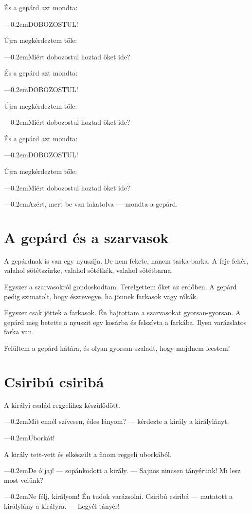 \documentclass[12pt]{memoir}
\def\dash{---\kern 0.2em}
\begin{document}
És a gepárd azt mondta:

\dash DOBOZOSTUL!

Újra megkérdeztem tőle:

\dash Miért dobozostul hoztad őket ide?

És a gepárd azt mondta:

\dash DOBOZOSTUL!

Újra megkérdeztem tőle:

\dash Miért dobozostul hoztad őket ide?

És a gepárd azt mondta:

\dash DOBOZOSTUL!

Újra megkérdeztem tőle:

\dash Miért dobozostul hoztad őket ide?

\dash Azért, mert be van lakatolva — mondta a gepárd.


\section*{A gepárd és a szarvasok}
A gepárdnak is van egy nyuszija. De nem fekete, hanem tarka-barka. A feje
fehér, valahol sötétszürke, valahol sötétkék, valahol sötétbarna.

Egyszer a szarvasokról gondoskodtam. Terelgettem őket az erdőben. A gepárd
pedig szimatolt, hogy észrevegye, ha jönnek farkasok vagy rókák.

Egyszer csak jöttek a farkasok. Én hajtottam a szarvasokat gyorsan-gyorsan. A
gepárd meg betette a nyuszit egy kosárba és felszívta a farkába. Ilyen
varázslatos farka van.

Felültem a gepárd hátára, és olyan gyorsan szaladt, hogy majdnem leestem!


\section*{Csiribú csiribá}
A királyi család reggelihez készülődött.

\dash Mit ennél szívesen, édes lányom? — kérdezte a király a királylányt.

\dash Uborkát!

A király tett-vett és elkészült a finom reggeli uborkából.

\dash De ó jaj! — sopánkodott a király. — Sajnos nincsen tányérunk! Mi lesz most
velünk?

\dash Ne félj, királyom! Én tudok varázsolni. Csiribú csiribá — mutatott a
királylány a királyra. — Legyél tányér!
\end{document}
